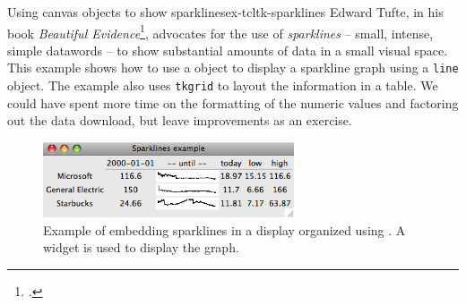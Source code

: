 \begin{example}{Using canvas objects to show sparklines}{ex-tcltk-sparklines}
Edward Tufte, in his book \textit{Beautiful
  Evidence}\footcite{Tufte:Beautiful-Evidence}, advocates for the use of
\textit{sparklines} -- small, intense, simple datawords -- to show substantial
amounts of data in a small visual space. This example shows how to use
a  object to display a sparkline graph using a \texttt{line} object. The example also uses \texttt{tkgrid}
to layout the information in a  table. We could have spent more time on the
formatting of the numeric values and factoring out the data download, but leave improvements as an exercise.


\begin{figure}
  \centering
  \includegraphics[width=0.66\textwidth]{fig-tcltk-sparklines.png}
  \caption{Example of embedding sparklines in a display organized
    using . A  widget is used to display
    the graph.}
  \label{fig:fig-tcltk-sparklines}
\end{figure}



\end{example}
